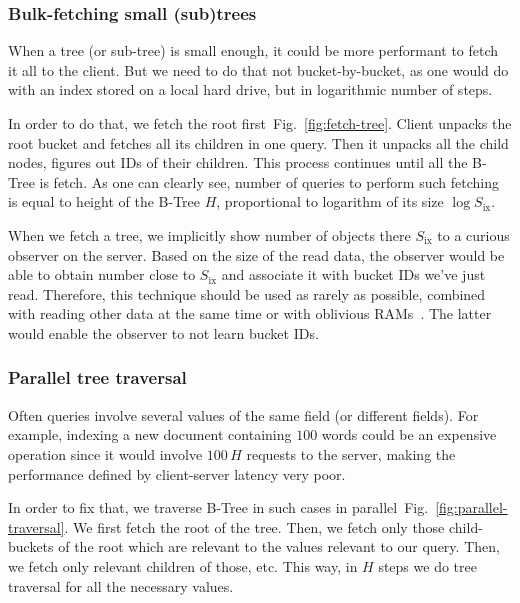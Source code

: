\documentclass[notitlepage]{revtex4-1}
\newcommand{\figref}[1]{Fig.~\ref{#1}}
\begin{document}
\subsubsection{Bulk-fetching small (sub)trees}
\label{sec:bulk-fetching}

When a tree (or sub-tree) is small enough, it could be more performant to fetch it all to the client.
But we need to do that not bucket-by-bucket, as one would do with an index stored on a local hard drive, but in logarithmic number of steps.

In order to do that, we fetch the root first~\figref{fig:fetch-tree}.
Client unpacks the root bucket and fetches all its children in one query.
Then it unpacks all the child nodes, figures out IDs of their children.
This process continues until all the B-Tree is fetch.
As one can clearly see, number of queries to perform such fetching is equal to height of the B-Tree $H$, proportional to logarithm of its size $\log{S_{\mbox{ix}}}$.

When we fetch a tree, we implicitly show number of objects there $S_{\mbox{ix}}$ to a curious observer on the server.
Based on the size of the read data, the observer would be able to obtain number close to $S_{\mbox{ix}}$ and associate it with bucket IDs we've just read.
Therefore, this technique should be used as rarely as possible, combined with reading other data at the same time or with oblivious RAMs~\cite{path-oram,burst-oram,oram-multicloud,ods-wang-2014}.
The latter would enable the observer to not learn bucket IDs.

\subsubsection{Parallel tree traversal}
\label{sec:parallel-traversal}

Often queries involve several values of the same field (or different fields).
For example, indexing a new document containing $100$ words could be an expensive operation since it would involve $100\,H$ requests to the server, making the performance defined by client-server latency very poor.

In order to fix that, we traverse B-Tree in such cases in parallel~\figref{fig:parallel-traversal}.
We first fetch the root of the tree.
Then, we fetch only those child-buckets of the root which are relevant to the values relevant to our query.
Then, we fetch only relevant children of those, etc.
This way, in $H$ steps we do tree traversal for all the necessary values.
\end{document}

